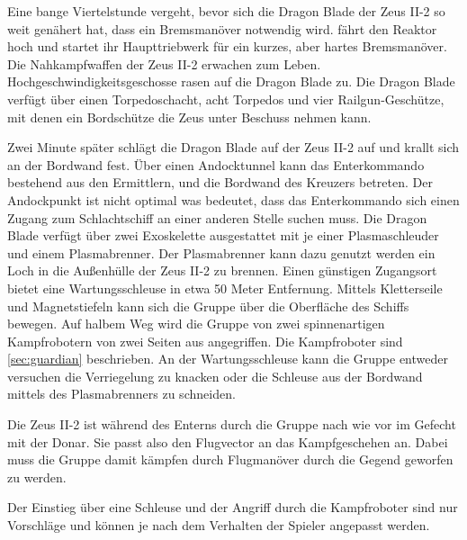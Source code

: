 Eine bange Viertelstunde vergeht, bevor sich die Dragon Blade der Zeus II-2 so weit genähert hat, dass ein Bremsmanöver notwendig wird. \xl{} fährt den Reaktor hoch und startet ihr Haupttriebwerk für ein kurzes, aber hartes Bremsmanöver. Die Nahkampfwaffen der Zeus II-2 erwachen zum Leben. Hochgeschwindigkeitsgeschosse rasen auf die Dragon Blade zu. Die Dragon Blade verfügt über einen Torpedoschacht, acht Torpedos und vier Railgun-Geschütze, mit denen ein Bordschütze die Zeus unter Beschuss nehmen kann.

Zwei Minute später schlägt die Dragon Blade auf der Zeus II-2 auf und krallt sich an der Bordwand fest. Über einen Andocktunnel kann das Enterkommando bestehend aus den Ermittlern, \xl{} und \ml{} die Bordwand des Kreuzers betreten. Der Andockpunkt ist nicht optimal was bedeutet, dass das Enterkommando sich einen Zugang zum Schlachtschiff an einer anderen Stelle suchen muss. Die Dragon Blade verfügt über zwei Exoskelette ausgestattet mit je einer Plasmaschleuder und einem Plasmabrenner. Der Plasmabrenner kann dazu genutzt werden ein Loch in die Außenhülle der Zeus II-2 zu brennen. Einen günstigen Zugangsort bietet eine Wartungsschleuse in etwa 50 Meter Entfernung. Mittels Kletterseile und Magnetstiefeln kann sich die Gruppe über die Oberfläche des Schiffs bewegen. Auf halbem Weg wird die Gruppe von zwei spinnenartigen Kampfrobotern von zwei Seiten aus angegriffen. Die Kampfroboter sind \cref{sec:guardian} beschrieben. An der Wartungsschleuse kann die Gruppe entweder versuchen die Verriegelung zu knacken oder die Schleuse aus der Bordwand mittels des Plasmabrenners zu schneiden.

\begin{remarks}
	Die Zeus II-2 ist während des Enterns durch die Gruppe nach wie vor im Gefecht mit der Donar. Sie passt also den Flugvector an das Kampfgeschehen an. Dabei muss die Gruppe damit kämpfen durch Flugmanöver durch die Gegend geworfen zu werden.

	Der Einstieg über eine Schleuse und der Angriff durch die Kampfroboter sind nur Vorschläge und können je nach dem Verhalten der Spieler angepasst werden.
\end{remarks}
